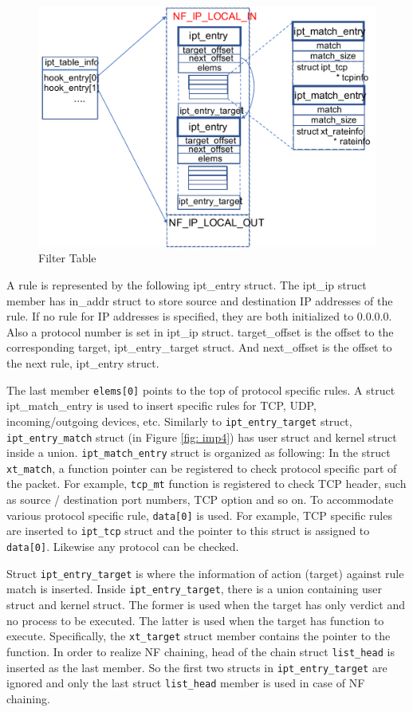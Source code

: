 \begin{figure}
	\centering
	\includegraphics[width=140mm]{pics/filter_table.pdf}
	\caption{Filter Table}
	\label{fig: filter_table}
\end{figure}

A rule is represented by the following ipt\_entry struct. The ipt\_ip struct member has in\_addr struct to store source and destination IP addresses of the rule. If no rule for IP addresses is specified, they are both initialized to 0.0.0.0. Also a protocol number is set in ipt\_ip struct. target\_offset is the offset to the corresponding target, ipt\_entry\_target struct. And next\_offset is the offset to the next rule, ipt\_entry struct. 

The last member {\tt elems[0]} points to the top of protocol specific rules. A struct ipt\_match\_entry is used to insert specific rules for TCP, UDP, incoming/outgoing devices, etc. Similarly to {\tt ipt\_entry\_target} struct, {\tt ipt\_entry\_match} struct (in Figure \ref{fig: imp4}) has user struct and kernel struct inside a union. {\tt ipt\_match\_entry} struct is organized as following:  In the struct {\tt xt\_match}, a function pointer can be registered to check protocol specific part of the packet. For example, {\tt tcp\_mt} function is registered to check TCP header, such as source / destination port numbers, TCP option and so on. To accommodate various protocol specific rule, {\tt data[0]} is used. For example, TCP specific rules are inserted to {\tt ipt\_tcp} struct and the pointer to this struct is assigned to {\tt data[0]}. Likewise any protocol can be checked. 

Struct {\tt ipt\_entry\_target} is where the information of action (target) against rule match is inserted. Inside {\tt ipt\_entry\_target}, there is a union containing user struct and kernel struct. The former is used when the target has only verdict and no process to be executed. The latter is used when the target has function to  execute. Specifically, the {\tt xt\_target} struct member contains the pointer to the function. In order to realize NF chaining, head of the chain struct {\tt list\_head} is inserted as the last member. So the first two structs in {\tt ipt\_entry\_target} are ignored and only the last struct {\tt list\_head} member is used in case of NF chaining. 

